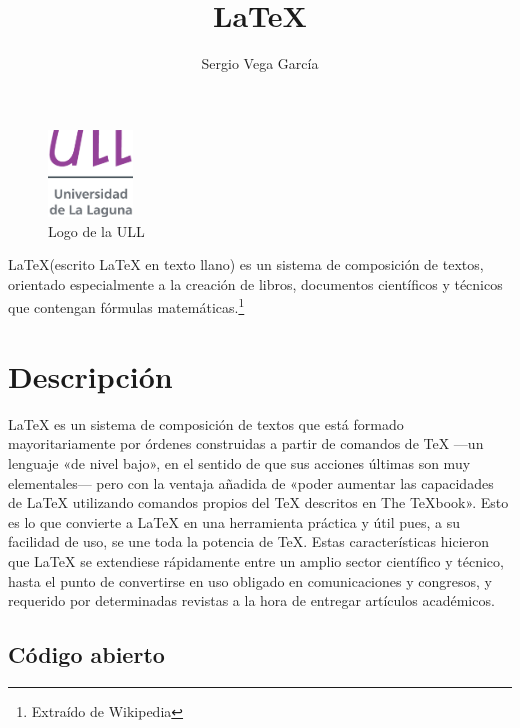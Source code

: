 \documentclass{article}
\title{\LaTeX}
\author{Sergio Vega García}
\begin{document}
\begin{figure}
  \begin{center}
  \includegraphics[width=0.20\textwidth]{img/ullesc.eps}
  \end{center}
  \caption{Logo de la ULL}

\end{figure}

 
 \maketitle
 
 \LaTeX (escrito LaTeX en texto llano) es un sistema de composición de textos, orientado especialmente a la creación de libros, 
 documentos científicos y técnicos que contengan fórmulas matemáticas.\footnote{Extraído de Wikipedia}
 
 \pagebreak
 
 \section{Descripción}
 
 LaTeX es un sistema de composición de textos que está formado mayoritariamente por órdenes construidas a partir de comandos de 
 TeX —un lenguaje «de nivel bajo», en el sentido de que sus acciones últimas son muy elementales— 
 pero con la ventaja añadida de «poder aumentar las capacidades de LaTeX utilizando comandos propios del TeX descritos en The TeXbook». \cite{prueba1}
 Esto es lo que convierte a LaTeX en una herramienta práctica y útil pues, a su facilidad de uso, se une toda la potencia de TeX. 
 Estas características hicieron que LaTeX se extendiese rápidamente entre un amplio sector científico y técnico, 
 hasta el punto de convertirse en uso obligado en comunicaciones y congresos, y requerido por determinadas revistas a 
 la hora de entregar artículos académicos. \cite{prueba2}
 
    \subsection{Código abierto}
    
\end{document}
